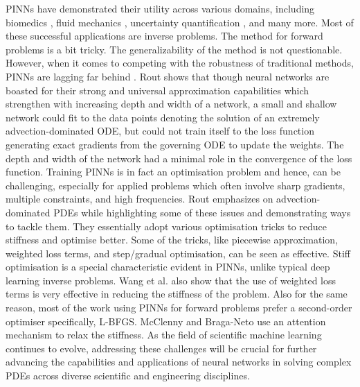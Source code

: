 \documentclass{article}
\begin{document}
PINNs have demonstrated their utility across various domains, including biomedics \cite{arzani2021, Sahli2020foPhys}, fluid mechanics \cite{raissi2020, cai2021physics}, uncertainty quantification \cite{Zhu_2019, YANG2019136}, and many more. Most of these successful applications are inverse problems. The method for forward problems is a bit tricky. The generalizability of the method is not questionable. However, when it comes to competing with the robustness of traditional methods, PINNs are lagging far behind \cite{femVspinn}. Rout \cite{rout2019numerical} shows that though neural networks are boasted for their strong and universal approximation capabilities which strengthen with increasing depth and width of a network, a small and shallow network could fit to the data points denoting the solution of an extremely advection-dominated ODE, but could not train itself to the loss function generating exact gradients from the governing ODE to update the weights. The depth and width of the network had a minimal role in the convergence of the loss function. Training PINNs is in fact an optimisation problem and hence, can be challenging, especially for applied problems which often involve sharp gradients, multiple constraints, and high frequencies. Rout \cite{rout2019numerical} emphasizes on advection-dominated PDEs while highlighting some of these issues and demonstrating ways to tackle them. They essentially adopt various optimisation tricks to reduce stiffness and optimise better. Some of the tricks, like piecewise approximation, weighted loss terms, and step/gradual optimisation, can be seen as effective. Stiff optimisation is a special characteristic evident in PINNs, unlike typical deep learning inverse problems. Wang et al. \cite{wang2021understanding} also show that the use of weighted loss terms is very effective in reducing the stiffness of the problem. Also for the same reason, most of the work using PINNs for forward problems \cite{RAISSI2019686, femVspinn, SHUKLA2021110683, jagtap2020extended, Shin2020OnTC} prefer a second-order optimiser specifically, L-BFGS. McClenny and Braga-Neto \cite{mcclenny2023self} use an attention mechanism to relax the stiffness. As the field of scientific machine learning continues to evolve, addressing these challenges will be crucial for further advancing the capabilities and applications of neural networks in solving complex PDEs across diverse scientific and engineering disciplines.
\end{document}
